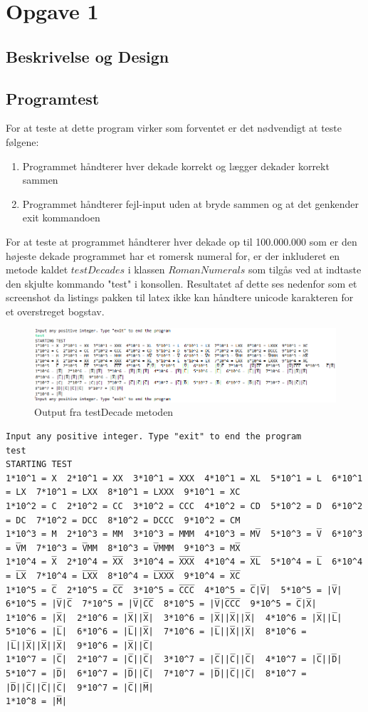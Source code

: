 \section{Opgave 1}
\subsection{Beskrivelse og Design}

\subsection{Programtest}
	For at teste at dette program virker som forventet er det nødvendigt at teste følgene:
 	\begin{enumerate}
 		\item Programmet håndterer hver dekade korrekt og lægger dekader korrekt sammen
 		\item Programmet håndterer fejl-input uden at bryde sammen og at det genkender exit kommandoen
 	\end{enumerate}
 	For at teste at programmet håndterer hver dekade op til 100.000.000 som er den højeste dekade programmet har et romersk numeral for, er der inkluderet en metode kaldet $testDecades$ i klassen $RomanNumerals$ som tilgås ved at indtaste den skjulte kommando "test" i konsollen. Resultatet af dette ses nedenfor som et screenshot da listings pakken til latex ikke kan håndtere unicode karakteren for et overstreget bogstav.
 	\begin{figure}[h]
 	
 	\includegraphics[scale=0.8]{test_opgave_1.png}
 	\caption{Output fra testDecade metoden}
	
	\end{figure}
	\begin{lstlisting}
Input any positive integer. Type "exit" to end the program
test
STARTING TEST
1*10^1 = X  2*10^1 = XX  3*10^1 = XXX  4*10^1 = XL  5*10^1 = L  6*10^1 = LX  7*10^1 = LXX  8*10^1 = LXXX  9*10^1 = XC  
1*10^2 = C  2*10^2 = CC  3*10^2 = CCC  4*10^2 = CD  5*10^2 = D  6*10^2 = DC  7*10^2 = DCC  8*10^2 = DCCC  9*10^2 = CM  
1*10^3 = M  2*10^3 = MM  3*10^3 = MMM  4*10^3 = MV̅  5*10^3 = V̅  6*10^3 = V̅M  7*10^3 = V̅MM  8*10^3 = V̅MMM  9*10^3 = MX̅  
1*10^4 = X̅  2*10^4 = X̅X̅  3*10^4 = X̅X̅X̅  4*10^4 = X̅L̅  5*10^4 = L̅  6*10^4 = L̅X̅  7*10^4 = L̅X̅X̅  8*10^4 = L̅X̅X̅X̅  9*10^4 = X̅C̅  
1*10^5 = C̅  2*10^5 = C̅C̅  3*10^5 = C̅C̅C̅  4*10^5 = C̅|V̅|  5*10^5 = |V̅|  6*10^5 = |V̅|C̅  7*10^5 = |V̅|C̅C̅  8*10^5 = |V̅|C̅C̅C̅  9*10^5 = C̅|X̅|  
1*10^6 = |X̅|  2*10^6 = |X̅||X̅|  3*10^6 = |X̅||X̅||X̅|  4*10^6 = |X̅||L̅|  5*10^6 = |L̅|  6*10^6 = |L̅||X̅|  7*10^6 = |L̅||X̅||X̅|  8*10^6 = |L̅||X̅||X̅||X̅|  9*10^6 = |X̅||C̅|  
1*10^7 = |C̅|  2*10^7 = |C̅||C̅|  3*10^7 = |C̅||C̅||C̅|  4*10^7 = |C̅||D̅|  5*10^7 = |D̅|  6*10^7 = |D̅||C̅|  7*10^7 = |D̅||C̅||C̅|  8*10^7 = |D̅||C̅||C̅||C̅|  9*10^7 = |C̅||M̅|  
1*10^8 = |M̅|  
	\end{lstlisting}
